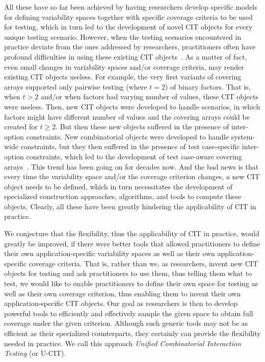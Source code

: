 \documentclass[EPiCempty]{easychair}
\begin{document}
All these have so far been achieved by having researchers develop  specific models for defining variability spaces together with specific coverage criteria to be used for testing, which in turn led to the development of novel CIT objects for every unique testing scenario. However, when the testing scenarios encountered in practice deviate from the ones addressed by researchers, practitioners often have profound difficulties in using these existing CIT objects~\cite{yilmaz2014moving}. As a matter of fact, even small changes in variability spaces and/or coverage criteria, may render existing CIT objects useless. For example, the very first variants of covering arrays supported only pairwise testing (where $t$$=$$2$) of binary factors. That is, when $t$$>$$2$ and/or when factors had varying number of values, these CIT objects were useless. Then, new CIT objects were developed to handle scenarios, in which factors might have different number of values and the covering arrays could be created for $t\ge2$. But then these new objects suffered in the presence of inter-option constraints. New combinatorial objects were developed to handle system-wide constraints, but they then suffered in the presence of test case-specific inter-option constraints, which led to the development of test case-aware covering arrays~\cite{yilmaz2013test}. This trend has been going on for decades now. And the bad news is that every time the variability space and/or the coverage criterion changes, a new CIT object needs to be defined, which in turn necessitates the development of specialized construction approaches, algorithms, and tools to compute these objects. Clearly, all these have been greatly hindering the applicability of CIT in practice. 

We conjecture that the flexibility, thus the applicability of CIT in practice, would greatly be improved, if there were better tools that allowed practitioners to define their own application-specific variability spaces as well as their own application-specific coverage criteria. That is, rather than we, as researchers, invent new CIT objects for testing and ask practitioners to use them, thus telling them what to test, we would like to enable practitioners to define their own space for testing as well as their own coverage criterion, thus enabling them to invent their own application-specific CIT objects. Our goal as researchers is then to develop powerful tools to efficiently and effectively sample the given space to obtain full coverage under the given criterion. Although such generic tools may not be as efficient as their specialized counterparts, they certainly can provide the flexibility needed in practice. We call this approach {\em Unified Combinatorial Interaction Testing} (or U-CIT).
\end{document}
